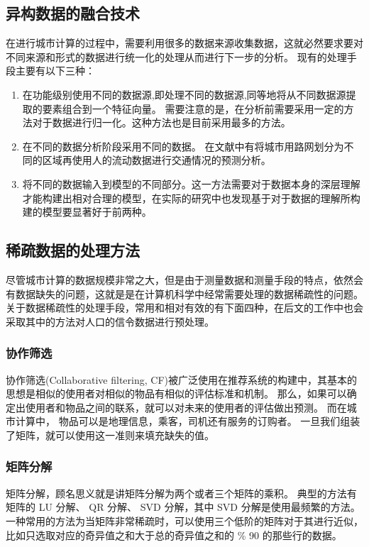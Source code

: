 \subsection{异构数据的融合技术}
在进行城市计算的过程中，需要利用很多的数据来源收集数据，这就必然要求要对不同来源和形式的数据进行统一化的处理从而进行下一步的分析。
现有的处理手段主要有以下三种：
\begin{enumerate}
	\item 在功能级别使用不同的数据源,即处理不同的数据源,同等地将从不同数据源提取的要素组合到一个特征向量。 需要注意的是，在分析前需要采用一定的方法对于数据进行归一化。这种方法也是目前采用最多的方法。
	\item 在不同的数据分析阶段采用不同的数据。 在文献中\cite{zheng2011urban}有将城市用路网划分为不同的区域再使用人的流动数据进行交通情况的预测分析。
	\item 将不同的数据输入到模型的不同部分。这一方法需要对于数据本身的深层理解才能构建出相对合理的模型，在实际的研究\cite{Zheng2013U,yuan2012discovering}中也发现基于对于数据的理解所构建的模型要显著好于前两种。
\end{enumerate}

\subsection{稀疏数据的处理方法}
尽管城市计算的数据规模非常之大，但是由于测量数据和测量手段的特点，依然会有数据缺失的问题，这就是是在计算机科学中经常需要处理的数据稀疏性的问题。 关于数据稀疏性的处理手段，常用和相对有效的有下面四种，在后文的工作中也会采取其中的方法对人口的信令数据进行预处理。
\subsubsection*{协作筛选}
协作筛选(Collaborative filtering, CF)被广泛使用在推荐系统的构建中，其基本的思想是相似的使用者对相似的物品有相似的评估标准和机制\cite{goldberg1992using}。 那么，如果可以确定出使用者和物品之间的联系，就可以对未来的使用者的评估做出预测\cite{nakamura1998collaborative}。 而在城市计算中， 物品可以是地理信息，乘客，司机还有服务的订购者。 一旦我们组装了矩阵，就可以使用这一准则来填充缺失的值。
\subsubsection*{矩阵分解}
矩阵分解，顾名思义就是讲矩阵分解为两个或者三个矩阵的乘积。 典型的方法有矩阵的 LU 分解、 QR 分解、 SVD 分解，其中 SVD 分解是使用最频繁的方法。 一种常用的方法为当矩阵非常稀疏时，可以使用三个低阶的矩阵对于其进行近似，比如只选取对应的奇异值之和大于总的奇异值之和的 \% 90 的那些行的数据。
